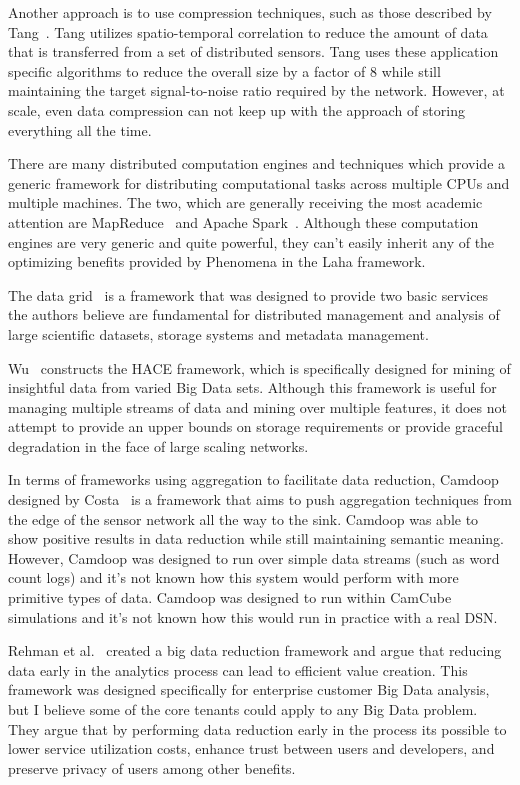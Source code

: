 Another approach is to use compression techniques, such as those described by Tang~\cite{tang2004compression}. Tang utilizes spatio-temporal correlation to reduce the amount of data that is transferred from a set of distributed sensors. Tang uses these application specific algorithms to reduce the overall size by a factor of 8 while still maintaining the target signal-to-noise ratio required by the network. However, at scale, even data compression can not keep up with the approach of storing everything all the time.

There are many distributed computation engines and techniques which provide a generic framework for distributing computational tasks across multiple CPUs and multiple machines. The two, which are generally receiving the most academic attention are MapReduce~\cite{dean2008mapreduce} and Apache Spark~\cite{zaharia2016apache}. Although these computation engines are very generic and quite powerful, they can't easily inherit any of the optimizing benefits provided by Phenomena in the Laha framework.

The data grid~\cite{chervenak2000data} is a framework that was designed to provide two basic services the authors believe are fundamental for distributed management and analysis of large scientific datasets, storage systems and metadata management.

Wu~\cite{wu2014data} constructs the HACE framework, which is specifically designed for mining of insightful data from varied Big Data sets. Although this framework is useful for managing multiple streams of data and mining over multiple features, it does not attempt to provide an upper bounds on storage requirements or provide graceful degradation in the face of large scaling networks.

In terms of frameworks using aggregation to facilitate data reduction, Camdoop designed by Costa~\cite{costa2012camdoop} is a framework that aims to push aggregation techniques from the edge of the sensor network all the way to the sink. Camdoop was able to show positive results in data reduction while still maintaining semantic meaning. However, Camdoop was designed to run over simple data streams (such as word count logs) and it's not known how this system would perform with more primitive types of data. Camdoop was designed to run within CamCube simulations and it's not known how this would run in practice with a real DSN.

Rehman et al.~\cite{ur2016big} created a big data reduction framework and argue that reducing data early in the analytics process can lead to efficient value creation. This framework was designed specifically for enterprise customer Big Data analysis, but I believe some of the core tenants could apply to any Big Data problem. They argue that by performing data reduction early in the process its possible to lower service utilization costs, enhance trust between users and developers, and preserve privacy of users among other benefits.

